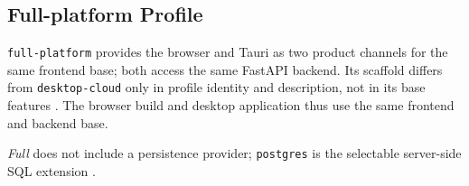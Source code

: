 \subsection{Full-platform Profile}
\label{subsec:profil-full-platform}

\texttt{full-platform} provides the browser and Tauri as two product channels
for the same frontend base; both access the same FastAPI backend. Its scaffold
differs from \texttt{desktop-\allowbreak cloud} only in profile identity and
description, not in its base features
\parencite{kleiveist2026profiles,kleiveist2026governance-snapshot}.
The browser build and desktop application thus use the same frontend and
backend base.

\emph{Full} does not include a persistence provider; \texttt{postgres} is the
selectable server-side SQL extension \parencite{kleiveist2026persistence}.
